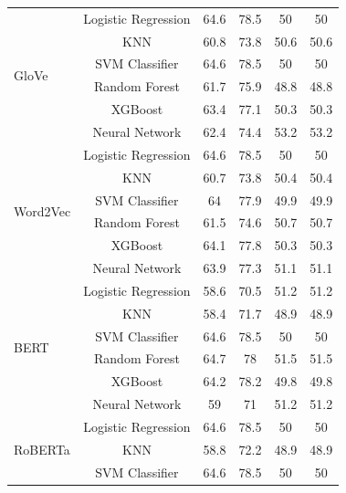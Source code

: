 \begin{table}[htb]
\begin{tabular}{l|c|c|c|c|c}
\hline
\multirow{6}{*}{GloVe}
    & Logistic Regression & 64.6 & 78.5 & 50   &      50   \\
    & KNN &       60.8 &       73.8 &                50.6 &      50.6 \\
    & SVM Classifier &       64.6 &       78.5 &                50   &      50   \\
    & Random Forest &       61.7 &       75.9 &                48.8 &      48.8 \\
    & XGBoost &       63.4 &       77.1 &                50.3 &      50.3 \\
    & Neural Network &       62.4 &       74.4 &                53.2 &      53.2 \\
\hline
\multirow{6}{*}{Word2Vec}
    & Logistic Regression &       64.6 &       78.5 &                50   &      50   \\
    & KNN &       60.7 &       73.8 &                50.4 &      50.4 \\
    & SVM Classifier &       64   &       77.9 &                49.9 &      49.9 \\
    & Random Forest &       61.5 &       74.6 &                50.7 &      50.7 \\
    & XGBoost &       64.1 &       77.8 &                50.3 &      50.3 \\
    & Neural Network &       63.9 &       77.3 &                51.1 &      51.1 \\
\hline
\multirow{6}{*}{BERT} 
    & Logistic Regression &       58.6 &       70.5 &                51.2 &      51.2 \\
    & KNN &       58.4 &       71.7 &                48.9 &      48.9 \\
    & SVM Classifier &       64.6 &       78.5 &                50   &      50   \\
    & Random Forest &       64.7 &       78   &                51.5 &      51.5 \\
    & XGBoost &       64.2 &       78.2 &                49.8 &      49.8 \\
    & Neural Network &       59   &       71   &                51.2 &      51.2 \\
\hline
\multirow{6}{*}{RoBERTa} 
    & Logistic Regression &       64.6 &       78.5 &                50   &      50   \\
    & KNN &       58.8 &       72.2 &                48.9 &      48.9 \\
    & SVM Classifier &       64.6 &       78.5 &                50   &      50   \\

\end{tabular}
\end{table}

